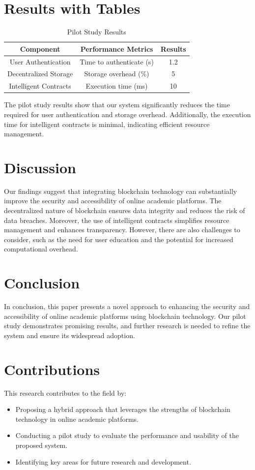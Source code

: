 \documentclass{article}
\begin{document}
\section{Results with Tables}
\begin{table}[ht]
\centering
\begin{tabular}{|c|c|c|}
\hline
\textbf{Component} & \textbf{Performance Metrics} & \textbf{Results} \\
\hline
User Authentication & Time to authenticate (s) & 1.2 \\
Decentralized Storage & Storage overhead (\%) & 5 \\
Intelligent Contracts & Execution time (ms) & 10 \\
\hline
\end{tabular}
\caption{Pilot Study Results}
\label{tab:pilot_results}
\end{table}

The pilot study results show that our system significantly reduces the time required for user authentication and storage overhead. Additionally, the execution time for intelligent contracts is minimal, indicating efficient resource management.

\section{Discussion}
Our findings suggest that integrating blockchain technology can substantially improve the security and accessibility of online academic platforms. The decentralized nature of blockchain ensures data integrity and reduces the risk of data breaches. Moreover, the use of intelligent contracts simplifies resource management and enhances transparency. However, there are also challenges to consider, such as the need for user education and the potential for increased computational overhead.

\section{Conclusion}
In conclusion, this paper presents a novel approach to enhancing the security and accessibility of online academic platforms using blockchain technology. Our pilot study demonstrates promising results, and further research is needed to refine the system and ensure its widespread adoption.

\section{Contributions}
This research contributes to the field by:
\begin{itemize}
\item Proposing a hybrid approach that leverages the strengths of blockchain technology in online academic platforms.
\item Conducting a pilot study to evaluate the performance and usability of the proposed system.
\item Identifying key areas for future research and development.
\end{itemize}



\end{document}
